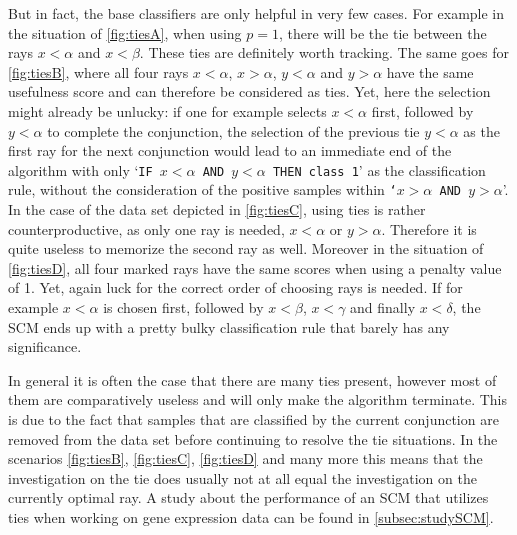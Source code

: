 But in fact, the base classifiers are only helpful in very few cases.
For example in the situation of \autoref{fig:tiesA}, when using \(p=1\), there will be the tie between the rays \(x < \alpha\) and \(x < \beta\).
These ties are definitely worth tracking.
The same goes for \autoref{fig:tiesB}, where all four rays \(x < \alpha\), \(x > \alpha\), \(y < \alpha\) and \(y > \alpha\)
have the same usefulness score and can therefore be considered as ties.
Yet, here the selection might already be unlucky: if one for example selects \(x < \alpha\) first, followed by \(y < \alpha\)
to complete the conjunction, the selection of the previous tie \(y < \alpha\) as the first ray for the next conjunction would lead to 
an immediate end of the algorithm with only `\texttt{IF \(x < \alpha\) AND \(y < \alpha\) THEN class 1}' as the classification rule,
without the consideration of the positive samples within \texttt{`\(x > \alpha\) AND \(y > \alpha\)}'.
In the case of the data set depicted in \autoref{fig:tiesC}, using ties is rather counterproductive,
as only one ray is needed, \(x < \alpha\) or \(y > \alpha\).
Therefore it is quite useless to memorize the second ray as well.
Moreover in the situation of \autoref{fig:tiesD}, all four marked rays have the same scores when using a penalty value of 1.
Yet, again luck for the correct order of choosing rays is needed.
If for example \(x < \alpha\) is chosen first, followed by \(x < \beta\), \(x < \gamma\) and finally \(x < \delta\),
the SCM ends up with a pretty bulky classification rule that barely has any significance.

In general it is often the case that there are many ties present, however most of them are comparatively useless and will only make the algorithm terminate.
This is due to the fact that samples that are classified by the current conjunction are removed from the data set before continuing
to resolve the tie situations.
In the scenarios \autoref{fig:tiesB}, \autoref{fig:tiesC}, \autoref{fig:tiesD} and many more this means that the investigation on the tie does usually not at all equal the investigation on the currently optimal ray.
A study about the performance of an SCM that utilizes ties when working on gene expression data can be found in \autoref{subsec:studySCM}.

